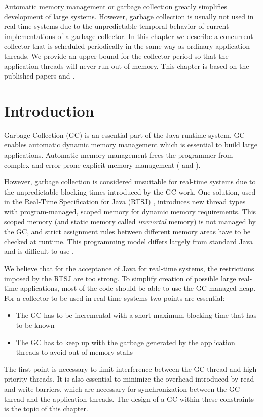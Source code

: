 Automatic memory management or garbage collection greatly simplifies
development of large systems. However, garbage collection is usually
not used in real-time systems due to the unpredictable temporal
behavior of current implementations of a garbage collector. In this
chapter we describe a concurrent collector that is scheduled
periodically in the same way as ordinary application threads. We
provide an upper bound for the collector period so that the
application threads will never run out of memory. This chapter is
based on the published papers \cite{jop:rtgc_sched} and
\cite{jop:scjgc}.


\section{Introduction}

Garbage Collection (GC) is an essential part of the Java runtime
system. GC enables automatic dynamic memory management which is
essential to build large applications. Automatic memory management
frees the programmer from complex and error prone explicit memory
management ( and ).

However, garbage collection is considered unsuitable for real-time
systems due to the unpredictable blocking times introduced by the GC
work. One solution, used in the Real-Time Specification for Java
(RTSJ) \cite{rtsj}, introduces new thread types with program-managed,
scoped memory for dynamic memory requirements. This scoped memory
(and static memory called \emph{immortal} memory) is not managed by
the GC, and strict assignment rules between different memory areas
have to be checked at runtime. This programming model differs largely
from standard Java and is difficult to use \cite{Niessner03,
conf/isorc/PizloFHV04}.

We believe that for the acceptance of Java for real-time systems, the
restrictions imposed by the RTSJ are too strong. To simplify creation
of possible large real-time applications, most of the code should be
able to use the GC managed heap. For a collector to be used in
real-time systems two points are essential:
\begin{itemize}
    \item The GC has to be incremental with a short maximum blocking time
    that has to be known
    \item The GC has to keep up with the garbage generated by the
    application threads to avoid out-of-memory stalls
\end{itemize}
The first point is necessary to limit interference between the GC
thread and high-priority threads. It is also essential to minimize
the overhead introduced by read- and write-barriers, which are
necessary for synchronization between the GC thread and the
application threads. The design of a GC within these constraints is
the topic of this chapter.

